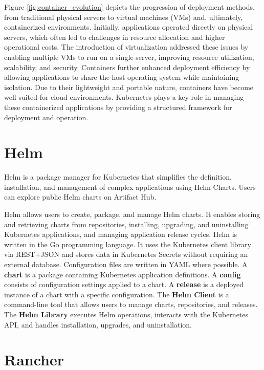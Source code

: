 \documentclass[../main.tex]{subfiles}
\begin{document}
Figure \ref{fig:container_evolution} depicts the progression of deployment methods, from traditional physical servers to virtual machines (VMs) and, ultimately, containerized environments. Initially, applications operated directly on physical servers, which often led to challenges in resource allocation and higher operational costs. The introduction of virtualization addressed these issues by enabling multiple VMs to run on a single server, improving resource utilization, scalability, and security. Containers further enhanced deployment efficiency by allowing applications to share the host operating system while maintaining isolation. Due to their lightweight and portable nature, containers have become well-suited for cloud environments. Kubernetes plays a key role in managing these containerized applications by providing a structured framework for deployment and operation. \cite{kubernetes}

\section{Helm}

Helm is a package manager for Kubernetes that simplifies the definition, installation, and management of complex applications using Helm Charts. Users can explore public Helm charts on Artifact Hub. \cite{helm} 

Helm allows users to create, package, and manage Helm charts. It enables storing and retrieving charts from repositories, installing, upgrading, and uninstalling Kubernetes applications, and managing application release cycles. Helm is written in the Go programming language. It uses the Kubernetes client library via REST+JSON and stores data in Kubernetes Secrets without requiring an external database. Configuration files are written in YAML where possible. A \textbf{chart} is a package containing Kubernetes application definitions. A \textbf{config} consists of configuration settings applied to a chart. A \textbf{release} is a deployed instance of a chart with a specific configuration. The \textbf{Helm Client} is a command-line tool that allows users to manage charts, repositories, and releases. The \textbf{Helm Library} executes Helm operations, interacts with the Kubernetes API, and handles installation, upgrades, and uninstallation. \cite{helmarchitecture}

\section{Rancher}
\end{document}

